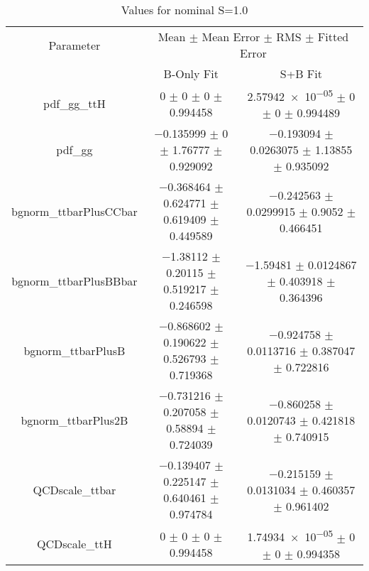 \begin{table}
\centering
\caption{Values for nominal S=1.0}
\begin{tabular}{ccc}
\toprule
Parameter & \multicolumn{2}{c}{Mean $\pm$ Mean Error $\pm$ RMS $\pm$ Fitted Error}\\
 & B-Only Fit & S+B Fit\\
\midrule
pdf\_gg\_ttH & \num{0} $\pm$ \num{0} $\pm$ \num{0} $\pm$ \num{0.994458} & \num{2.57942e-05} $\pm$ \num{0} $\pm$ \num{0} $\pm$ \num{0.994489}\\
pdf\_gg & \num{-0.135999} $\pm$ \num{0} $\pm$ \num{1.76777} $\pm$ \num{0.929092} & \num{-0.193094} $\pm$ \num{0.0263075} $\pm$ \num{1.13855} $\pm$ \num{0.935092}\\
bgnorm\_ttbarPlusCCbar & \num{-0.368464} $\pm$ \num{0.624771} $\pm$ \num{0.619409} $\pm$ \num{0.449589} & \num{-0.242563} $\pm$ \num{0.0299915} $\pm$ \num{0.9052} $\pm$ \num{0.466451}\\
bgnorm\_ttbarPlusBBbar & \num{-1.38112} $\pm$ \num{0.20115} $\pm$ \num{0.519217} $\pm$ \num{0.246598} & \num{-1.59481} $\pm$ \num{0.0124867} $\pm$ \num{0.403918} $\pm$ \num{0.364396}\\
bgnorm\_ttbarPlusB & \num{-0.868602} $\pm$ \num{0.190622} $\pm$ \num{0.526793} $\pm$ \num{0.719368} & \num{-0.924758} $\pm$ \num{0.0113716} $\pm$ \num{0.387047} $\pm$ \num{0.722816}\\
bgnorm\_ttbarPlus2B & \num{-0.731216} $\pm$ \num{0.207058} $\pm$ \num{0.58894} $\pm$ \num{0.724039} & \num{-0.860258} $\pm$ \num{0.0120743} $\pm$ \num{0.421818} $\pm$ \num{0.740915}\\
QCDscale\_ttbar & \num{-0.139407} $\pm$ \num{0.225147} $\pm$ \num{0.640461} $\pm$ \num{0.974784} & \num{-0.215159} $\pm$ \num{0.0131034} $\pm$ \num{0.460357} $\pm$ \num{0.961402}\\
QCDscale\_ttH & \num{0} $\pm$ \num{0} $\pm$ \num{0} $\pm$ \num{0.994458} & \num{1.74934e-05} $\pm$ \num{0} $\pm$ \num{0} $\pm$ \num{0.994358}\\
\bottomrule
\end{tabular}
\end{table}